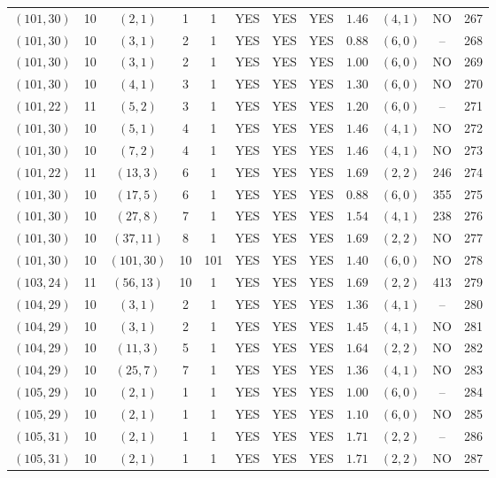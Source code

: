 \begin{longtable}{|c|c|c|c|c|c|c|c|c|c|c|c|}
$(101,30)$ & 10 & $(2,1)$ & 1 & 1 & YES & YES & YES & $1.46$ & $(4,1)$ & NO & 267\\
$(101,30)$ & 10 & $(3,1)$ & 2 & 1 & YES & YES & YES & $0.88$ & $(6,0)$ & -- & 268\\
$(101,30)$ & 10 & $(3,1)$ & 2 & 1 & YES & YES & YES & $1.00$ & $(6,0)$ & NO & 269\\
$(101,30)$ & 10 & $(4,1)$ & 3 & 1 & YES & YES & YES & $1.30$ & $(6,0)$ & NO & 270\\
$(101,22)$ & 11 & $(5,2)$ & 3 & 1 & YES & YES & YES & $1.20$ & $(6,0)$ & -- & 271\\
$(101,30)$ & 10 & $(5,1)$ & 4 & 1 & YES & YES & YES & $1.46$ & $(4,1)$ & NO & 272\\
$(101,30)$ & 10 & $(7,2)$ & 4 & 1 & YES & YES & YES & $1.46$ & $(4,1)$ & NO & 273\\
$(101,22)$ & 11 & $(13,3)$ & 6 & 1 & YES & YES & YES & $1.69$ & $(2,2)$ & 246 & 274\\
$(101,30)$ & 10 & $(17,5)$ & 6 & 1 & YES & YES & YES & $0.88$ & $(6,0)$ & 355 & 275\\
$(101,30)$ & 10 & $(27,8)$ & 7 & 1 & YES & YES & YES & $1.54$ & $(4,1)$ & 238 & 276\\
$(101,30)$ & 10 & $(37,11)$ & 8 & 1 & YES & YES & YES & $1.69$ & $(2,2)$ & NO & 277\\
$(101,30)$ & 10 & $(101,30)$ & 10 & 101 & YES & YES & YES & $1.40$ & $(6,0)$ & NO & 278\\
$(103,24)$ & 11 & $(56,13)$ & 10 & 1 & YES & YES & YES & $1.69$ & $(2,2)$ & 413 & 279\\
$(104,29)$ & 10 & $(3,1)$ & 2 & 1 & YES & YES & YES & $1.36$ & $(4,1)$ & -- & 280\\
$(104,29)$ & 10 & $(3,1)$ & 2 & 1 & YES & YES & YES & $1.45$ & $(4,1)$ & NO & 281\\
$(104,29)$ & 10 & $(11,3)$ & 5 & 1 & YES & YES & YES & $1.64$ & $(2,2)$ & NO & 282\\
$(104,29)$ & 10 & $(25,7)$ & 7 & 1 & YES & YES & YES & $1.36$ & $(4,1)$ & NO & 283\\
$(105,29)$ & 10 & $(2,1)$ & 1 & 1 & YES & YES & YES & $1.00$ & $(6,0)$ & -- & 284\\
$(105,29)$ & 10 & $(2,1)$ & 1 & 1 & YES & YES & YES & $1.10$ & $(6,0)$ & NO & 285\\
$(105,31)$ & 10 & $(2,1)$ & 1 & 1 & YES & YES & YES & $1.71$ & $(2,2)$ & -- & 286\\
$(105,31)$ & 10 & $(2,1)$ & 1 & 1 & YES & YES & YES & $1.71$ & $(2,2)$ & NO & 287\\

\end{longtable}
